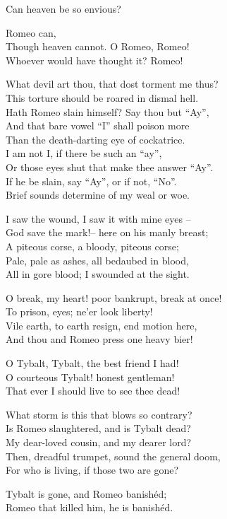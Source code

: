 \documentclass[10pt,a4paper]{article}
\begin{document}
\begin{drama*}
\julspeaks
Can heaven be so envious?

\nursespeaks
Romeo can,\\
Though heaven cannot. O Romeo, Romeo!\\
Whoever would have thought it? Romeo!

\julspeaks
What devil art thou, that dost torment me thus?\\
This torture should be roared in dismal hell.\\
Hath Romeo slain himself? Say thou but “Ay”,\\
And that bare vowel “I” shall poison more\\
Than the death-darting eye of cockatrice.\\
I am not I, if there be such an “ay”,\\
Or those eyes shut that make thee answer “Ay”.\\
If he be slain, say “Ay”, or if not, “No”.\\
Brief sounds determine of my weal or woe.

\nursespeaks
I saw the wound, I saw it with mine eyes – \\ 
God save the mark!– here on his manly breast;\\
A piteous corse, a bloody, piteous corse;\\
Pale, pale as ashes, all bedaubed in blood,\\
All in gore blood; I swounded at the sight.

\julspeaks
O break, my heart! poor bankrupt, break at once!\\
To prison, eyes; ne’er look liberty!\\
Vile earth, to earth resign, end motion here,\\
And thou and Romeo press one heavy bier!

\nursespeaks
O Tybalt, Tybalt, the best friend I had!\\
O courteous Tybalt! honest gentleman!\\
That ever I should live to see thee dead!

\julspeaks
What storm is this that blows so contrary?\\ 
Is Romeo slaughtered, and is Tybalt dead?\\
My dear-loved cousin, and my dearer lord?\\
Then, dreadful trumpet, sound the general doom,\\
For who is living, if those two are gone?

\nursespeaks
Tybalt is gone, and Romeo banishéd;\\
Romeo that killed him, he is banishéd.


\end{drama*}
\end{document}
